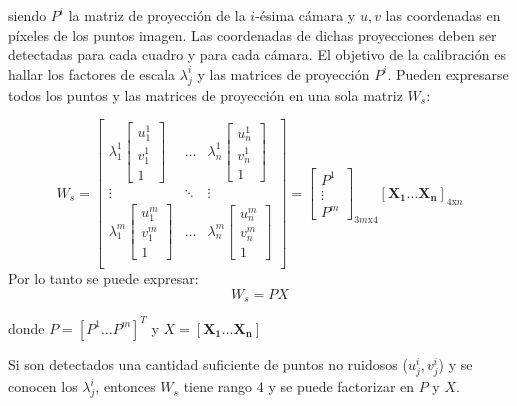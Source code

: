 siendo $P^i$ la matriz de proyección de la $i$-ésima cámara y $u,v$ las coordenadas en píxeles de los puntos imagen. Las coordenadas de dichas proyecciones deben ser detectadas para cada cuadro y para cada cámara. El objetivo de la calibración es hallar los factores de escala $\lambda_j^i$ y las matrices de proyección $P^i$. Pueden expresarse todos los puntos y las matrices de proyección en una sola matriz $W_s$:

\[
W_s =
\begin{bmatrix}

	\lambda_1^1
	\begin{bmatrix}
	u_1^1 \\
	v_1^1 \\
	1
	\end{bmatrix} &
	
	\ldots &
	
	\lambda_n^1
	\begin{bmatrix}
	u_n^1 \\
	v_n^1 \\
	1
	\end{bmatrix} \\
	
	\vdots & \ddots & \vdots \\
	
	
	\lambda_1^m
	\begin{bmatrix}
	u_1^m \\
	v_1^m \\
	1
	\end{bmatrix} &
	
	\ldots &
	
	\lambda_n^m
	\begin{bmatrix}
	u_n^m \\
	v_n^m \\
	1
	\end{bmatrix} \\

\end{bmatrix}
= 
\begin{bmatrix}
P^1 \\
\vdots \\
P^m
\end{bmatrix}_{3m\text{x}4}
\left[ \mathbf{X_1} \ldots \mathbf{X_n}\right] _{4\text{x}n}
\]
Por lo tanto se puede expresar:
\[ W_s = PX\]

donde $P = [P^1 \ldots P^m]^T$ y $X = [\mathbf{X_1} \ldots \mathbf{X_n}]$

Si son detectados una cantidad suficiente de puntos no ruidosos ($u_j^i, v_j^i$) y se conocen los $\lambda_j^i$, entonces $W_s$ tiene rango 4  y se puede factorizar en $P$ y $X$.\\

